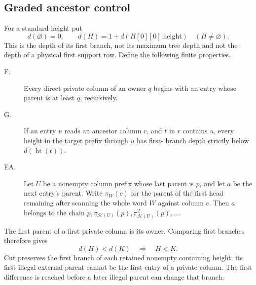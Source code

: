 \subsection{Graded ancestor control}
For a standard height put
\[
 d(\varnothing)=0,\qquad
 d(H)=1+d(H[0][0].\mathrm{height})\quad(H\ne\varnothing).
\]
This is the depth of its first branch, not its maximum tree depth and
not the depth of a physical first support row. Define the following
finite properties.
\begin{description}
\item[F.] Every direct private column of an owner $q$ begins with an
entry whose parent is at least $q$, recursively.
\item[G.] If an entry $u$ reads an ancestor column $r$, and $t$ in $r$
contains $u$, every height in the target prefix through $u$ has first-
branch depth strictly below $d(\operatorname{ht}(t))$.
\item[EA.] Let $U$ be a nonempty column prefix whose last parent is $p$,
and let $a$ be the next entry's parent. Write $\pi_W(c)$ for the parent
of the first head remaining after scanning the whole word $W$ against
column $c$. Then $a$ belongs to the chain
$p,\pi_{\mathcal H(U)}(p),\pi_{\mathcal H(U)}^2(p),\ldots$.
\end{description}
The first parent of a first private column is its owner. Comparing first
branches therefore gives
\begin{equation}\label{eq:3-1}
 d(H)<d(K)\quad\Longrightarrow\quad H<K.                 
\end{equation}
Cut preserves the first branch of each retained nonempty containing
height: its first illegal external parent cannot be the first entry
of a private column. The first difference is reached before a later illegal parent can
change that branch.

